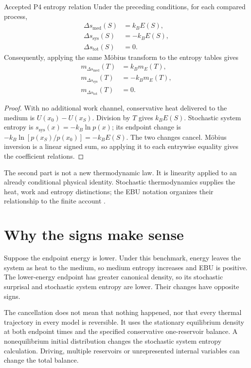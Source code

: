 \begin{theorem}{Accepted P4 entropy relation}\label{thm:entropy}
Under the preceding conditions, for each compared process,
\begin{align}\label{eq:entropy-entrywise}
 \Delta s_{\mathrm{med}}(S)&=k_BE(S),\nonumber\\
 \Delta s_{\mathrm{sys}}(S)&=-k_BE(S),\\
 \Delta s_{\mathrm{tot}}(S)&=0.\nonumber
\end{align}
Consequently, applying the same Möbius transform to the entropy tables gives
\begin{align}\label{eq:entropy-mobius}
 m_{\Delta s_{\mathrm{med}}}(T)&=k_Bm_E(T),\nonumber\\
 m_{\Delta s_{\mathrm{sys}}}(T)&=-k_Bm_E(T),\\
 m_{\Delta s_{\mathrm{tot}}}(T)&=0.\nonumber
\end{align}
\end{theorem}
\begin{proof}
With no additional work channel, conservative heat delivered to the medium is $U(x_0)-U(x_S)$. Division by $T$ gives $k_BE(S)$. Stochastic system entropy is $s_{\mathrm{sys}}(x)=-k_B\ln p(x)$; its endpoint change is $-k_B\ln[p(x_S)/p(x_0)]=-k_BE(S)$. The two changes cancel. Möbius inversion is a linear signed sum, so applying it to each entrywise equality gives the coefficient relations.
\end{proof}

The second part is not a new thermodynamic law. It is linearity applied to an already conditional physical identity. Stochastic thermodynamics supplies the heat, work and entropy distinctions; the EBU notation organizes their relationship to the finite account \cite{seifert,maes}.

\section{Why the signs make sense}
Suppose the endpoint energy is lower. Under this benchmark, energy leaves the system as heat to the medium, so medium entropy increases and EBU is positive. The lower-energy endpoint has greater canonical density, so its stochastic surprisal and stochastic system entropy are lower. Their changes have opposite signs.

The cancellation does not mean that nothing happened, nor that every thermal trajectory in every model is reversible. It uses the stationary equilibrium density at both endpoint times and the specified conservative one-reservoir balance. A nonequilibrium initial distribution changes the stochastic system entropy calculation. Driving, multiple reservoirs or unrepresented internal variables can change the total balance.

